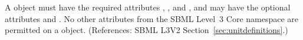 A \Unit object must have the required attributes ,
,  and , and may have the
optional attributes   and .  No other
attributes from the SBML Level~3 Core namespace are permitted on a \Unit
object.  (References: SBML L3V2 Section~\ref{sec:unitdefinitions}.)
